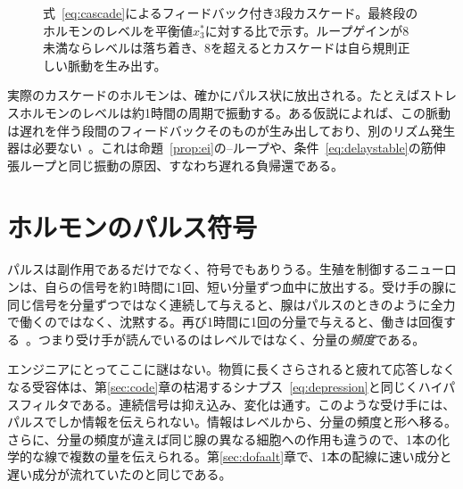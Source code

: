 \begin{figure}[t]
\centering
{}
\caption{式~\eqref{eq:cascade}によるフィードバック付き3段カスケード。最終段のホルモンのレベルを平衡値$x_3^*$に対する比で示す。ループゲインが8未満ならレベルは落ち着き、8を超えるとカスケードは自ら規則正しい脈動を生み出す。}
\label{fig:cascade}
\end{figure}

実際のカスケードのホルモンは、確かにパルス状に放出される。たとえばストレスホルモンのレベルは約1時間の周期で振動する。ある仮説によれば、この脈動は遅れを伴う段間のフィードバックそのものが生み出しており、別のリズム発生器は必要ない~\cite{Walker2010}。これは命題~\ref{prop:ei}の--ループや、条件~\eqref{eq:delaystable}の筋伸張ループと同じ振動の原因、すなわち遅れる負帰還である。

\section{ホルモンのパルス符号}

パルスは副作用であるだけでなく、符号でもありうる。生殖を制御するニューロンは、自らの信号を約1時間に1回、短い分量ずつ血中に放出する。受け手の腺に同じ信号を分量ずつではなく連続して与えると、腺はパルスのときのように全力で働くのではなく、沈黙する。再び1時間に1回の分量で与えると、働きは回復する~\cite{Belchetz1978}。つまり受け手が読んでいるのはレベルではなく、分量の\emph{頻度}である。

エンジニアにとってここに謎はない。物質に長くさらされると疲れて応答しなくなる受容体は、第\ref{sec:code}章の枯渇するシナプス~\eqref{eq:depression}と同じくハイパスフィルタである。連続信号は抑え込み、変化は通す。このような受け手には、パルスでしか情報を伝えられない。情報はレベルから、分量の頻度と形へ移る。さらに、分量の頻度が違えば同じ腺の異なる細胞への作用も違うので、1本の化学的な線で複数の量を伝えられる。第\ref{sec:dofaalt}章で、1本の配線に速い成分と遅い成分が流れていたのと同じである。

